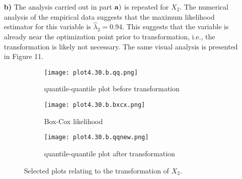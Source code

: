 \begin{enumerate}
	\item[\bf{b)}] The analysis carried out in part $\bf{a)}$ is repeated for $X_2$. The numerical analysis of the empirical data suggests that the maximum likelihood estimator for this variable is $\hat{\lambda}_2 = 0.94$. This suggests that the variable is already near the optimization point prior to transformation, i.e., the transformation is likely not necessary. The same visual analysis is presented in Figure 11.
\begin{figure}[H]
\begin{subfigure}{.33\textwidth}
  \centering
	\texttt{[image: plot4.30.b.qq.png]}
  \caption{quantile-quantile plot before transformation}
  \label{fig:sfig1}
\end{subfigure}%
\begin{subfigure}{.33\textwidth}
  \centering
	\texttt{[image: plot4.30.b.bxcx.png]}
  \caption{Box-Cox likelihood}
  \label{fig:sfig2}
\end{subfigure}
\begin{subfigure}{.33\textwidth}
  \centering
	\texttt{[image: plot4.30.b.qqnew.png]}
  \caption{quantile-quantile plot after transformation}
  \label{fig:sfig2}
\end{subfigure}
\caption{Selected plots relating to the transformation of $X_2$.}
\end{figure}


\end{enumerate}
